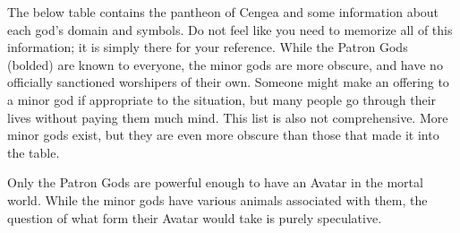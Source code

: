 \documentclass[blue]{GL2020}
\begin{document}
\name{\bPantheon{}}

The below table contains the pantheon of Cengea and some information about each god's domain and symbols. Do not feel like you need to memorize all of this information; it is simply there for your reference. While the Patron Gods (bolded) are known to everyone, the minor gods are more obscure, and have no officially sanctioned worshipers of their own. Someone might make an offering to a minor god if appropriate to the situation, but many people go through their lives without paying them much mind. This list is also not comprehensive. More minor gods exist, but they are even more obscure than those that made it into the table. 

Only the Patron Gods are powerful enough to have an Avatar in the mortal world. While the minor gods have various animals associated with them, the question of what form their Avatar would take is purely speculative.
\end{document}
